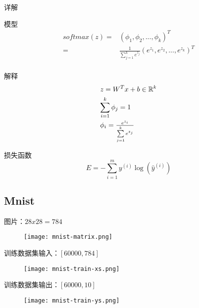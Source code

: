 \begin{frame}{详解}
\begin{block}{模型}
\[\begin{aligned}
  softmax (z) =  & {({\phi _1},{\phi _2},...,{\phi _k})^T} \\ 
   =  & \tfrac{1}{{\sum\limits_{j = 1}^k {{e^{{z_j}}}} }}{\left( {{e^{{z_1}}},{e^{{z_2}}},...,{e^{{z_k}}}} \right)^T} \\ 
\end{aligned} \]
\end{block}

\begin{block}{解释}
\[\begin{gathered}
  z = {W^T}x + b \in {\mathbb{R}^k} \hfill \\
  \sum\limits_{i = 1}^k {{\phi _j}}  = 1 \hfill \\
  {\phi _i} = \tfrac{{{e^{{z_i}}}}}{{\sum\limits_{j = 1}^k {{e^{{z_j}}}} }} \hfill \\ 
\end{gathered} \]
\end{block}
\end{frame}

\begin{frame}{损失函数}
\[E =  - \sum\limits_{i = 1}^m {{y^{(i)}}\log } \left( {{{\widehat y}^{(i)}}} \right)\]
\end{frame}

\subsection{Mnist}

\begin{frame}{图片：$ 28x28 = 784 $}
  \begin{figure}
    \centering
    \texttt{[image: mnist-matrix.png]}
  \end{figure}
\end{frame}

\begin{frame}{训练数据集输入：$ [60000, 784] $}
  \begin{figure}
    \centering
    \texttt{[image: mnist-train-xs.png]}
  \end{figure}
\end{frame}

\begin{frame}{训练数据集输出：$ [60000, 10] $}
  \begin{figure}
    \centering
    \texttt{[image: mnist-train-ys.png]}
  \end{figure}
\end{frame}

